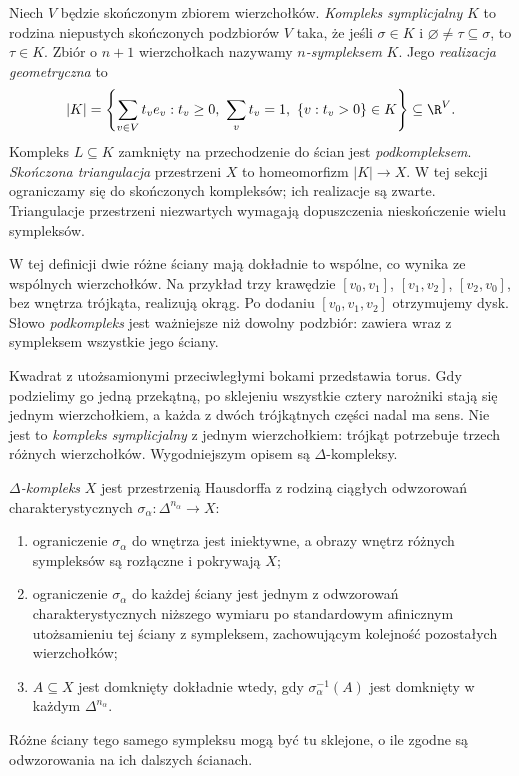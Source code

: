 \begin{definicja}
\label{def:kompleks-symplicjalny}
Niech $V$ będzie skończonym zbiorem
wierzchołków. \emph{Kompleks symplicjalny}
$K$ to rodzina niepustych skończonych
podzbiorów $V$ taka, że jeśli
$\sigma\in K$ i $\varnothing\ne\tau\subseteq\sigma$,
to $\tau\in K$. Zbiór o $n+1$
wierzchołkach nazywamy
\emph{$n$-sympleksem} $K$.
Jego \emph{realizacja geometryczna} to
\[
 |K|=\left\{\sum_{v\in V}t_v e_v:
 t_v\geq0,\ \sum_v t_v=1,\
 \{v:t_v>0\}\in K\right\}\subseteq\R^{V}.
\]
Kompleks $L\subseteq K$ zamknięty
na przechodzenie do ścian jest
\emph{podkompleksem}.
\emph{Skończona triangulacja} przestrzeni $X$
to homeomorfizm $|K|\to X$. W tej sekcji ograniczamy się do
skończonych kompleksów; ich realizacje są zwarte. Triangulacje
przestrzeni niezwartych wymagają dopuszczenia nieskończenie wielu sympleksów.
\end{definicja}

W tej definicji dwie różne ściany
mają dokładnie to wspólne, co
wynika ze wspólnych wierzchołków.
Na przykład trzy krawędzie
$[v_0,v_1]$, $[v_1,v_2]$,
$[v_2,v_0]$, bez wnętrza trójkąta,
realizują okrąg. Po dodaniu
$[v_0,v_1,v_2]$ otrzymujemy dysk.
Słowo \emph{podkompleks} jest
ważniejsze niż dowolny podzbiór:
zawiera wraz z sympleksem
wszystkie jego ściany.

\begin{uwaga}
\label{uwaga:delta-motywacja}
Kwadrat z utożsamionymi przeciwległymi
bokami przedstawia torus. Gdy podzielimy
go jedną przekątną, po sklejeniu wszystkie
cztery narożniki stają się jednym
wierzchołkiem, a każda z dwóch
trójkątnych części nadal ma sens.
Nie jest to \emph{kompleks symplicjalny}
z jednym wierzchołkiem: trójkąt
potrzebuje trzech różnych wierzchołków.
Wygodniejszym opisem są
$\Delta$-kompleksy.
\end{uwaga}

\begin{definicja}
\label{def:delta-kompleks}
\emph{$\Delta$-kompleks} $X$ jest
przestrzenią Hausdorffa z rodziną ciągłych odwzorowań charakterystycznych
$\sigma_\alpha:\Delta^{n_\alpha}\to X$:
\begin{enumerate}[label=(\roman*),leftmargin=*]
\item ograniczenie $\sigma_\alpha$ do wnętrza
      jest iniektywne, a obrazy wnętrz
      różnych sympleksów są rozłączne
      i pokrywają $X$;
\item ograniczenie $\sigma_\alpha$ do każdej
      ściany jest jednym z odwzorowań
      charakterystycznych niższego wymiaru
      po standardowym afinicznym
      utożsamieniu tej ściany z sympleksem, zachowującym
      kolejność pozostałych wierzchołków;
\item $A\subseteq X$ jest domknięty dokładnie
      wtedy, gdy $\sigma_\alpha^{-1}(A)$
      jest domknięty w każdym
      $\Delta^{n_\alpha}$.
\end{enumerate}
Różne ściany tego samego sympleksu
mogą być tu sklejone, o ile zgodne
są odwzorowania na ich dalszych ścianach.
\end{definicja}

